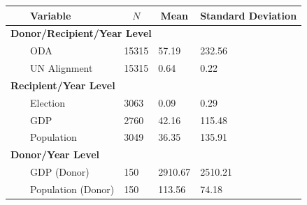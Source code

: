 %
\begin{tabular*}{\textwidth}{@{\extracolsep{\fill}}lllll}\hline\hline
\multicolumn{1}{l}{}&\multicolumn{1}{l}{Variable}&\multicolumn{1}{c}{$N$}&\multicolumn{1}{c}{Mean}&\multicolumn{1}{c}{Standard Deviation}\tabularnewline
\hline
\multicolumn{5}{l}{{\bfseries Donor/Recipient/Year Level}}\tabularnewline
~~&ODA&15315&57.19&232.56\tabularnewline
~~&UN Alignment&15315&0.64&0.22\tabularnewline
\hline
\multicolumn{5}{l}{{\bfseries Recipient/Year Level}}\tabularnewline
~~&Election&3063&0.09&0.29\tabularnewline
~~&GDP&2760&42.16&115.48\tabularnewline
~~&Population&3049&36.35&135.91\tabularnewline
\hline
\multicolumn{5}{l}{{\bfseries Donor/Year Level}}\tabularnewline
~~&GDP (Donor)&150&2910.67&2510.21\tabularnewline
~~&Population (Donor)&150&113.56&74.18\tabularnewline
\hline
\end{tabular*}

